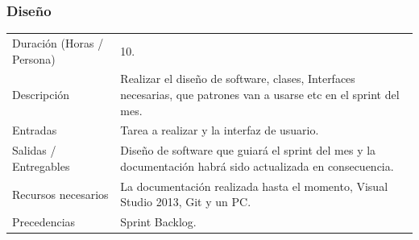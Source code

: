 \subsubsection{Dise\~{n}o}
\begin{table}[H]
    \begin{center}
        \begin{tabular}{l p{8cm}}
            Duraci\'{o}n (Horas / Persona)        & 10. \\ 
            Descripci\'{o}n                       & Realizar el diseño de software, clases, Interfaces necesarias, que patrones van a usarse etc 
                                                    en el sprint del mes. \\
            Entradas                              & Tarea a realizar y la interfaz de usuario.\\
            Salidas / Entregables                 & Dise\~{n}o de software que guiar\'{a} el sprint del mes y la documentaci\'{o}n
                                                    habr\'{a} sido actualizada en consecuencia. \\
            Recursos necesarios                   & La documentaci\'{o}n realizada hasta el momento, Visual Studio 2013, Git y 	un 
            										PC. \\
            Precedencias                          & Sprint Backlog. \\
        \end{tabular}
    \end{center}
    
\end{table}

